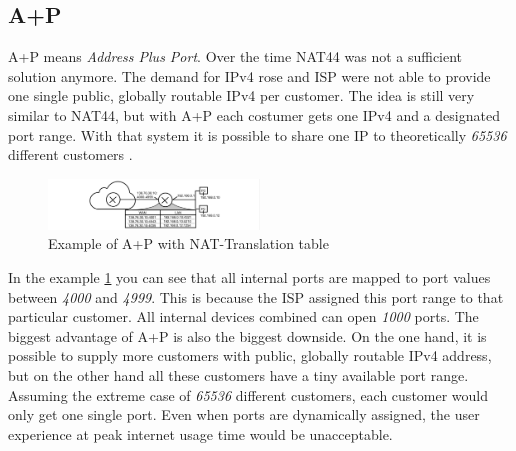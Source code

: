 \documentclass[format=sigconf, natbib=true, nonacm=true]{acmart}
\begin{document}
    \subsection{A+P}
    A+P means \textit{Address Plus Port}. Over the time NAT44 was not a sufficient solution anymore. The demand for IPv4 rose and ISP were not able to provide one single public, globally routable IPv4 per customer. The idea is still very similar to NAT44, but with A+P each costumer gets one IPv4 and a designated port range. With that system it is possible to share one IP to theoretically \textit{65536} different customers \cite{8716482}.
    \begin{figure}
        \centering
        \includegraphics[width=0.5\textwidth]{images/a_plus_p.png}
        \caption{Example of A+P with NAT-Translation table}
        \label{fig:a_plus_p}
    \end{figure}
    In the example \ref{fig:a_plus_p} you can see that all internal ports are mapped to port values between \textit{4000} and \textit{4999}. This is because the ISP assigned this port range to that particular customer. All internal devices combined can open \textit{1000} ports. The biggest advantage of A+P is also the biggest downside. On the one hand, it is possible to supply more customers with public, globally routable IPv4 address, but on the other hand all these customers have a tiny available port range. Assuming the extreme case of \textit{65536} different customers, each customer would only get one single port. Even when ports are dynamically assigned, the user experience at peak internet usage time would be unacceptable.
\end{document}
